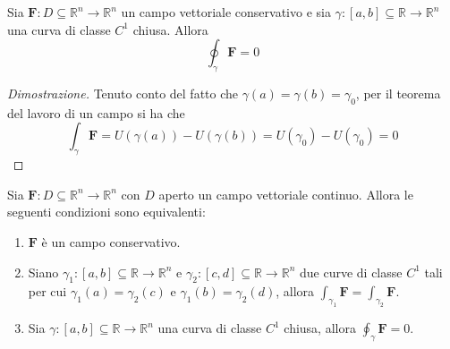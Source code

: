             \begin{corollary}
                Sia $\mathbf{F}: D \subseteq \mathbb{R}^{n} \rightarrow \mathbb{R}^{n}$ un campo vettoriale conservativo e sia $\gamma: [a, b] \subseteq \mathbb{R} \rightarrow \mathbb{R}^{n}$ una curva di classe $C^{1}$ chiusa.
                Allora
                \[
                        \oint_{\gamma} \mathbf{F} = 0
                \]
            \end{corollary}

            \begin{proof}[Dimostrazione]
                Tenuto conto del fatto che $\gamma(a) = \gamma(b) = \gamma_{0}$, per il teorema del lavoro di un campo si ha che
                \[
                    \int_{\gamma} \mathbf{F} = U(\gamma(a)) - U(\gamma(b)) = U(\gamma_{0}) - U(\gamma_{0}) = 0
                \]
            \end{proof}

            \begin{theorem}
                Sia $\mathbf{F}: D \subseteq \mathbb{R}^{n} \rightarrow \mathbb{R}^{n}$ con $D$ aperto un campo vettoriale continuo.
                Allora le seguenti condizioni sono equivalenti:
                \begin{enumerate}[label=(\Roman*)]
                    \item $\mathbf{F}$ è un campo conservativo.
                    \item Siano $\gamma_{1}: [a, b] \subseteq \mathbb{R} \rightarrow \mathbb{R}^{n}$ e $\gamma_{2}: [c, d] \subseteq \mathbb{R} \rightarrow \mathbb{R}^{n}$ due curve di classe $C^{1}$ tali per cui $\gamma_{1}(a) = \gamma_{2}(c)$ e $\gamma_{1}(b) = \gamma_{2}(d)$, allora $\displaystyle \int_{\gamma_1} \mathbf{F} = \int_{\gamma_2} \mathbf{F}$.
                    \item Sia $\gamma: [a, b] \subseteq \mathbb{R} \rightarrow \mathbb{R}^{n}$ una curva di classe $C^{1}$ chiusa, allora $\displaystyle \oint_{\gamma} \mathbf{F} = 0$.
                \end{enumerate}
            \end{theorem}

